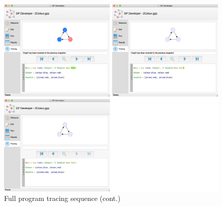\documentclass[authoryearcitations]{UoYCSproject}
\newenvironment{nscenter}
    {\parskip=0pt\par\nopagebreak\centering}
    {\par\noindent\ignorespacesafterend}
\begin{document}
\begin{appendices}
\begin{figure}[!htb]
    \ContinuedFloat
    \begin{nscenter}
        \includegraphics[width=\textwidth]{SeqCollage4}
    \end{nscenter}
    \caption{Full program tracing sequence (cont.)}
    \label{fig:TracingSequence}
\end{figure}


\end{appendices}
\end{document}
